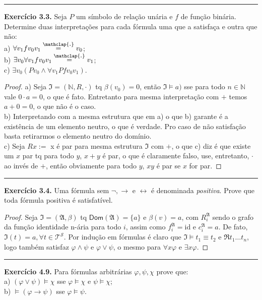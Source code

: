 \documentclass[11pt]{article}
\theoremstyle{definition}
\newcommand{\mc}[1]{\mathcal{#1}}
\newcommand{\mf}[1]{\mathfrak{#1}}
\newcommand{\msf}[1]{\mathsf{#1}}
\newcommand{\mbb}[1]{\mathbb{#1}}
\newcommand\overtext[2]{\stackrel{\mathclap{\normalfont\mbox{#1}}}{#2}}
\begin{document}
\hrule

\textbf{Exercício 3.3.} Seja $P$ um símbolo de relação unária e $f$ de função binária. Determine duas interpretações para cada fórmula uma que a satisfaça e outra que não:\\
a) $\forall v_1fv_0v_1\overtext{.}{=}v_0$;\\
b) $\exists v_0\forall v_1fv_0v_1\overtext{.}{=}v_1$;\\
c) $\exists v_0(Pv_0\wedge\forall v_1Pfv_0v_1)$.

\begin{proof}
    a) Seja $\mf{I}=(\mbb{N},R,\cdot)$ tq $\beta(v_0)=0$, então $\mf{I}\vDash a)$ sse para todo $n\in\mbb{N}$ vale $0\cdot a=0$, o que é fato. Entretanto para mesma interpretação com $+$ temos $a+0=0$, o que não é o caso.\\
    b) Interpretando com a mesma estrutura que em a) o que b) garante é a existência de um elemento neutro, o que é verdade. Pro caso de não satisfação basta retirarmos o elemento neutro do domínio.\\
    c) Seja $Rx:=$ x é par para mesma estrutura $\mf{I}$ com $+$, o que c) diz é que existe um $x$ par tq para todo $y$, $x+y$ é par, o que é claramente falso, use, entretanto, $\cdot$ ao invés de $+$, então obviamente para todo $y$, $xy$ é par se $x$ for par.
\end{proof}

\hrule

\textbf{Exercício 3.4.} Uma fórmula sem $\neg,\to$ e $\leftrightarrow$ é denominada \textit{positiva}. Prove que toda fórmula positiva é satisfatível.

\begin{proof}
    Seja $\mf{I}=(\mf{A},\beta)$ tq $\msf{Dom}(\mf{A})=\{a\}$ e $\beta(v)=a$, com $R_i^\mf{A}$ sendo o grafo da função identidade n-ária para todo $i$, assim como $f_i^\mf{A}=\text{id}$ e $c_i^\mf{A}=a$. De fato, $\mf{I}(t)=a,\forall t \in\mc{T}^\mc{S}$. Por indução em fórmulas é claro que $\mf{I}\vDash t_1\equiv t_2$ e $\mf{R}t_1\dots t_n$, logo também satisfaz $\varphi\wedge\psi$ e $\varphi\vee\psi$, o mesmo para $\forall x\varphi$ e $\exists x \varphi$.
\end{proof}

\hrule

\textbf{Exercício 4.9.}
Para fórmulas arbitrárias $\varphi,\psi,\chi$ prove que:\\
a) $(\varphi\vee\psi)\vDash\chi$ sse $\varphi\vDash\chi$ e $\psi\vDash\chi$;\\
b) $\vDash(\varphi\to\psi)$ sse $\varphi\vDash\psi$.
\end{document}

